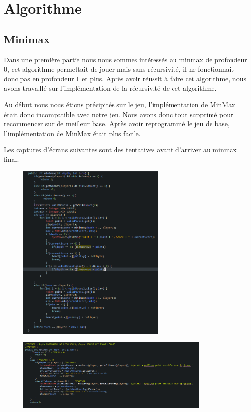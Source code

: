 \chapter{Algorithme}


\section{Minimax}

\flushleft Dans une première partie nous nous sommes
intéressés au minmax de profondeur 0, cet algorithme permettait de jouer mais sans récursivité, il
ne fonctionnait donc pas en profondeur 1 et plus. Après avoir réussit à faire cet algorithme, nous
avons travaillé sur l'implémentation de la récursivité de cet algorithme.


Au début nous nous étions précipités sur le jeu, l'implémentation de MinMax était donc incompatible
avec notre jeu. Nous avons donc tout supprimé pour recommencer sur de meilleur base.
Après avoir reprogrammé le jeu de base, l'implémentation de MinMax était plus facile.

Les captures d'écrans suivantes sont des tentatives avant d'arriver au minmax final.
\begin{figure}[!ht]
\begin{center}
\includegraphics[width=0.65\textwidth]{./MINMAXDEBUT1}
\end{center}
\end{figure}
\newpage

\begin{figure}[!ht]
\begin{center}
\includegraphics[width=0.85\textwidth]{./MINMAXDEBUT2}
\end{center}
\end{figure}

